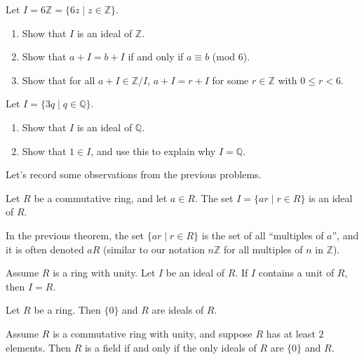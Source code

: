 \begin{problem}\label{prob.RepresentIntegerIdealsWithSmallNumber}
Let $I = 6\mathbb{Z} = \{6z \mid z\in \mathbb{Z}\}$.
\begin{enumerate}
\item Show that $I$ is an ideal of $\mathbb{Z}$.
\item  Show that $a + I = b + I$ if and only if $a \equiv b$ (mod $6$).
\item Show that for all $a + I \in\mathbb{Z}/I$, $a + I = r + I$ for some $r \in \mathbb{Z}$ with $0 \le r < 6$.
\end{enumerate}
\end{problem}

\begin{problem}
Let $I = \{3q \mid q\in \mathbb{Q}\}$.
\begin{enumerate}
\item Show that $I$ is an ideal of $\mathbb{Q}$.
\item Show that $1\in I$, and use this to explain why $I =  \mathbb{Q}$.
\end{enumerate}
\end{problem}

Let's record some observations from the previous problems.

\begin{theorem}\label{thm.MultiplesFormIdeal}
Let $R$ be a commutative ring, and let $a\in R$. The set $I = \{ar\mid r\in R\}$ is an ideal of $R$.
\end{theorem}

In the previous theorem, the set $\{ar\mid r\in R\}$ is the set of all ``multiples of $a$'', and it is often denoted $aR$ (similar to our notation  $n\mathbb{Z}$ for all multiples of $n$ in $\mathbb{Z}$).

\begin{theorem}\label{thm.IdealContainingUnitsEqualsR}
Assume $R$ is a ring with unity. Let $I$ be an ideal of $R$. If $I$ contains a unit of $R$, then $I = R$.
\end{theorem}

\begin{theorem}
Let $R$ be a ring. Then $\{0\}$ and $R$ are ideals of $R$.
\end{theorem}

\begin{theorem}\label{thm.CharacterizeFieldWithIdeals}
Assume $R$ is a commutative ring with unity, and suppose $R$ has at least $2$ elements. Then $R$ is a field if and only if the only ideals of $R$ are $\{0\}$ and $R$.
\end{theorem}

